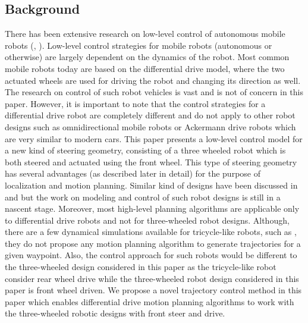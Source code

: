 \documentclass[conference]{IEEEtran}
\begin{document}
\subsection{Background}
There has been extensive research on low-level control of autonomous mobile robots (\cite{robot1}, \cite{robot2}). Low-level control strategies for mobile robots (autonomous or otherwise) are largely dependent on the dynamics of the robot. Most common mobile robots today are based on the differential drive model, where the two actuated wheels are used for driving the robot and changing its direction as well. The research on control of such robot vehicles is vast and is not of concern in this paper. However, it is important to note that the control strategies for a differential drive robot are completely different and do not apply to other robot designs such as omnidirectional mobile robots \cite{robot3} or Ackermann drive robots \cite{robot4} which are very similar to modern cars. This paper presents a low-level control model for a new kind of steering geometry, consisting of a three wheeled robot which is both steered and actuated using the front wheel. This type of steering geometry has several advantages (as described later in detail) for the purpose of localization and motion planning. Similar kind of designs have been discussed in \cite{robot5} and \cite{robot6} but the work on modeling and control of such robot designs is still in a nascent stage. Moreover, most high-level planning algorithms \cite{lavalle} are applicable only to differential drive robots and not for three-wheeled robot designs. Although, there are a few dynamical simulations available for tricycle-like robots, such as \cite{ros-tricycle}, they do not propose any motion planning algorithm to generate trajectories for a given waypoint. Also, the control approach for such robots would be different to the three-wheeled design considered in this paper as the tricycle-like robot consider rear wheel drive while the three-wheeled robot design considered in this paper is front wheel driven. We propose a novel trajectory control method in this paper which enables differential drive motion planning algorithms to work with the three-wheeled robotic designs with front steer and drive.\\
\end{document}
